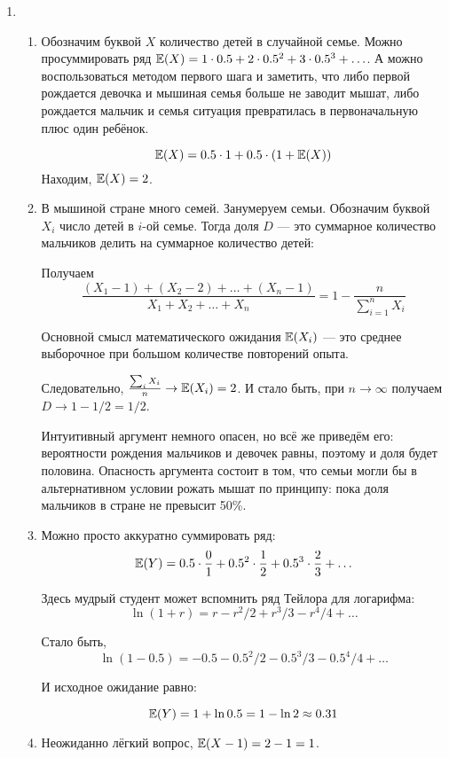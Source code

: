 \begin{enumerate}
\item
\begin{enumerate}
  \item Обозначим буквой $X$ количество детей в случайной семье.
  Можно просуммировать ряд $\operatorname{\mathbb{E}}(X) = 1\cdot 0.5 + 2\cdot 0.5^2 + 3\cdot 0.5^3 + \ldots$. 
  А можно воспользоваться методом первого шага и заметить, что либо первой рождается девочка 
  и мышиная семья больше не заводит мышат, либо рождается мальчик и семья ситуация превратилась в первоначальную
  плюс один ребёнок.

  \[
  \operatorname{\mathbb{E}}(X) = 0.5 \cdot 1 + 0.5 \cdot (1 + \operatorname{\mathbb{E}}(X))  
  \]
  Находим, $\operatorname{\mathbb{E}}(X)=2$.
  \item В мышиной стране много семей. Занумеруем семьи. Обозначим буквой $X_i$ число детей в $i$-ой семье.
  Тогда доля $D$ — это суммарное количество мальчиков делить на суммарное количество детей:

  Получаем
  \[
  \frac{(X_1 - 1) + (X_2 - 2)+ \ldots + (X_n - 1)}{X_1 + X_2 + \ldots +X_n} = 1 - \frac{n}{\sum_{i=1}^n X_i}  
  \]

  Основной смысл математического ожидания $\operatorname{\mathbb{E}}(X_i)$ — это среднее выборочное при большом количестве повторений опыта.

  Следовательно, $\frac{\sum_i X_i}{n} \to \operatorname{\mathbb{E}}(X_i)=2$. И стало быть, при $n\to\infty$ получаем $D \to 1 - 1/2=1/2$.

  Интуитивный аргумент немного опасен, но всё же приведём его: вероятности рождения мальчиков и девочек равны,
  поэтому и доля будет половина. 
  Опасность аргумента состоит в том, что семьи могли бы в альтернативном условии рожать мышат по принципу: 
  пока доля мальчиков в стране не превысит 50\%. 

  \item Можно просто аккуратно суммировать ряд:
  \[
  \operatorname{\mathbb{E}}(Y) = 0.5 \cdot \frac{0}{1} + 0.5^2 \cdot \frac{1}{2} + 0.5^3 \cdot \frac{2}{3} + \ldots
  \]

  Здесь мудрый студент может вспомнить ряд Тейлора для логарифма:
  \[
  \ln (1 + r) = r - r^2/2 + r^3/3 - r^4/4 +\ldots
  \]

  Стало быть,
  \[
  \ln (1 - 0.5) = -0.5 - 0.5^2/2 - 0.5^3/3 - 0.5^4/4  +\ldots 
  \]

  И исходное ожидание равно:

  \[
  \operatorname{\mathbb{E}}(Y) = 1 + \ln 0.5 = 1 - \ln 2 \approx 0.31  
  \]

\item Неожиданно лёгкий вопрос, $\operatorname{\mathbb{E}}(X - 1) = 2 -1=1$.
\end{enumerate}



\end{enumerate}
